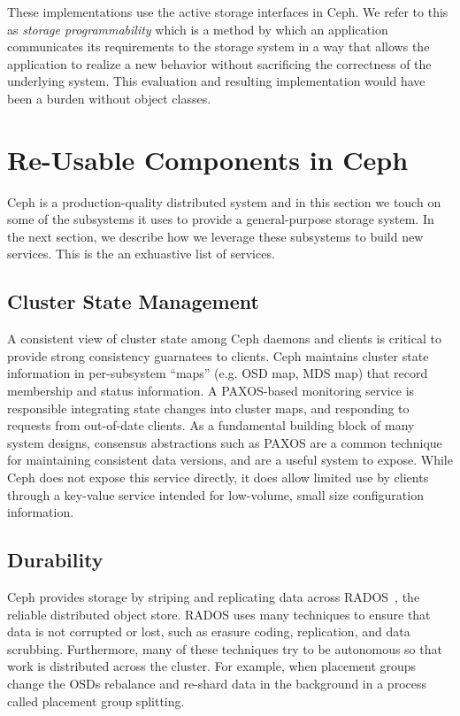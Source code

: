 \documentclass[10pt,twocolumn]{article}
\begin{document}
These implementations use the active storage interfaces in Ceph. We
refer to this as \emph{storage programmability} which is a method by
which an application communicates its requirements to the storage system
in a way that allows the application to realize a new behavior without
sacrificing the correctness of the underlying system. This evaluation
and resulting implementation would have been a burden without object
classes.

\section{Re-Usable Components in Ceph}\label{re-usable-components-in-ceph}

\label{background}

Ceph is a production-quality distributed system and in this section we
touch on some of the subsystems it uses to provide a general-purpose
storage system. In the next section, we describe how we leverage these
subsystems to build new services. This is the an exhuastive list of services.

\subsection{Cluster State Management}
\label{consistencyversioning-of-cluster-state}

A consistent view of cluster state among Ceph daemons and clients is critical
to provide strong consistency guarnatees to clients.  Ceph maintains cluster
state information in per-subsystem ``maps'' (e.g. OSD map, MDS map) that
record membership and status information. A PAXOS-based monitoring service is
responsible integrating state changes into cluster maps, and responding to
requests from out-of-date clients.  As a fundamental building block of many
system designs, consensus abstractions such as PAXOS are a common technique
for maintaining consistent data versions, and are a useful system to expose.
While Ceph does not expose this service directly, it does allow limited use by
clients through a key-value service intended for low-volume, small size
configuration information.

\subsection{Durability}
\label{sec:durability}

Ceph provides storage by striping and replicating data across
RADOS~\cite{weil_rados_2007}, the reliable distributed object store. RADOS
uses many techniques to ensure that data is not corrupted or lost, such as
erasure coding, replication, and data scrubbing. Furthermore, many of these
techniques try to be autonomous so that work is distributed across the
cluster. For example, when placement groups change the OSDs rebalance and
re-shard data in the background in a process called placement group splitting.
\end{document}
